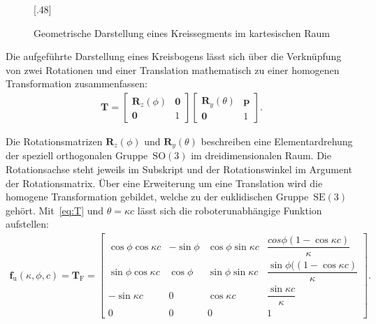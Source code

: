 \begin{figure}[hbt!]
\centering
{}[.48\linewidth]
{}
\label{fig:bogengeometrie}
{}
\caption[Geometrische Darstellung eines Kreissegments im kartesischen Raum]{Geometrische Darstellung eines Kreissegments im kartesischen Raum}
\label{fig:bogenparameter}
\end{figure}

Die aufgeführte Darstellung eines Kreisbogens lässt sich über die Verknüpfung von zwei Rotationen und einer Translation mathematisch zu einer homogenen Transformation zusammenfassen:
\begin{align}
\bm{T} = 
\begin{bmatrix}
\bm{R}_z(\phi) & \bm{0} \\
\bm{0} & 1
\end{bmatrix}
\begin{bmatrix}
\bm{R}_y(\theta) & \bm{p} \\
\bm{0} & 1
\end{bmatrix}.
\label{eq:T}
\end{align}

Die Rotationsmatrizen $\bm{R}_z(\phi)$ und $\bm{R}_y(\theta)$ beschreiben eine Elementardrehung der speziell orthogonalen Gruppe~$\mathrm{SO}(3)$ im dreidimensionalen Raum. Die Rotationsachse steht jeweils im Subskript und der Rotationswinkel im Argument der Rotationsmatrix. Über eine Erweiterung um eine Translation wird die homogene Transformation gebildet, welche zu der euklidischen Gruppe~$\mathrm{SE}(3)$ gehört. Mit~\eqref{eq:T} und $\theta=\kappa c$ lässt sich die roboterunabhängige Funktion aufstellen:
%
\begin{align}
\bm{f}_\mathrm{u}(\kappa,\phi,c) =
\bm{T}_\mathrm{F} = 
\begin{bmatrix}
\cos\phi \cos\kappa c & -\sin\phi & \cos\phi \sin\kappa c & \dfrac{cos\phi (1-\cos\kappa c)}{\kappa} \\
\sin\phi \cos\kappa c & \cos\phi & \sin\phi \sin\kappa c & \dfrac{\sin\phi( (1-\cos\kappa c)}{\kappa} \\
-\sin\kappa c &  0 & \cos\kappa c & \dfrac{\sin\kappa c}{\kappa} \\
0 & 0 & 0 & 1
\end{bmatrix}.
\label{eq:T_frenet}
\end{align}

